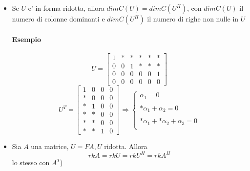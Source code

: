 \documentclass[a4paper, 10pt]{article}
\begin{document}
\begin{itemize}
	\item Se $U$ e' in forma ridotta, allora $dimC(U) = dimC(U^H)$, con $dimC(U)$ il numero di colonne dominanti e
		  $dimC(U^H)$ il numero di righe non nulle in $U$
	\paragraph*{Esempio} 
	\[  U = 
		\begin{bmatrix} 
			1 & * & * & * & *  & * \\
			0 & 0 & 1 & * & * & * \\
			0 & 0 & 0 & 0 & 0 & 1 \\
			0 & 0 & 0 & 0 & 0 & 0 
		\end{bmatrix} 
	\]
	\[  U^T = 
		\begin{bmatrix}
		1 & 0 & 0 & 0 \\
		* & 0 & 0 & 0 \\
		* & 1 & 0 & 0 \\
		* & * & 0 & 0 \\
		* & * & 0 & 0 \\
		* & * & 1 & 0 
		\end{bmatrix}
		\Rightarrow 
		\begin{cases}
		\alpha_1 = 0  \\ \\
		 *\alpha_1 + \alpha_2 = 0 \\ \\ 
		*\alpha_1 + *\alpha_2 + \alpha_3 = 0 \\
		\end{cases}
	\]
	\item Sia $A$ una matrice, $U = FA, U$ ridotta. Allora \[ rkA = rkU= rkU^H = rkA^H \] lo stesso con $A^T$)
	\end{itemize}
\end{document}
